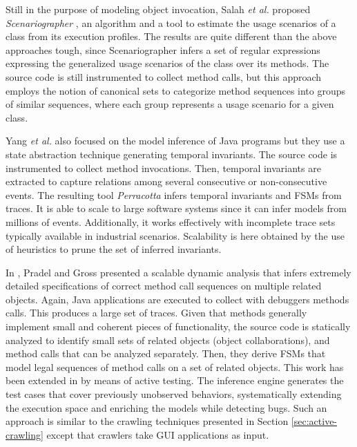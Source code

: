 Still in the purpose of modeling object invocation, Salah \emph{et al.}
proposed \textit{Scenariographer} \cite{Salah05scenariographer},
an algorithm and a tool to estimate the usage scenarios of a
class from its execution profiles. The results are quite
different than the above approaches tough, since Scenariographer
infers a set of regular expressions expressing the generalized
usage scenarios of the class over its methods. The source code is
still instrumented to collect method calls, but this approach
employs the notion of canonical sets to categorize method
sequences into groups of similar sequences, where each group
represents a usage scenario for a given class.

Yang \emph{et al.} \cite{Yang:2006:PMT:1134285.1134325} also focused on
the model inference of Java programs but they use a state
abstraction technique generating temporal invariants. The source
code is instrumented to collect method invocations. Then,
temporal invariants are extracted to capture relations among
several consecutive or non-consecutive events. The resulting tool
\textit{Perracotta} infers temporal invariants and FSMs from
traces. It is able to scale to large software systems since it
can infer models from millions of events. Additionally, it works
effectively with incomplete trace sets typically available in
industrial scenarios. Scalability is here obtained by the use of
heuristics to prune the set of inferred invariants.

In \cite{Pradel:2009}, Pradel and Gross presented a scalable
dynamic analysis that infers extremely detailed specifications of
correct method call sequences on multiple related objects. Again,
Java applications are executed to collect with debuggers methods
calls. This produces a large set of traces. Given that methods
generally implement small and coherent pieces of functionality,
the source code is statically analyzed to identify small sets of
related objects (object collaborations), and method calls that
can be analyzed separately. Then, they derive FSMs that model
legal sequences of method calls on a set of related objects. This
work has been extended in \cite{Dallmeier_generatingtest} by
means of active testing. The inference engine generates the test
cases that cover previously unobserved behaviors, systematically
extending the execution space and enriching the models while
detecting bugs. Such an approach is similar to the crawling
techniques presented in Section \ref{sec:active-crawling} except
that crawlers take GUI applications as input.

